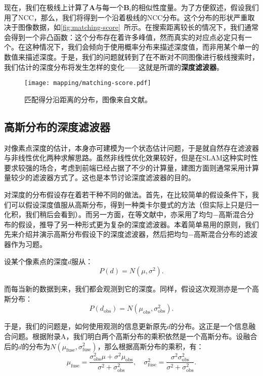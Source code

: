 现在，我们在极线上计算了$\bm{A}$与每一个$\bm{B}_i$的相似性度量。为了方便叙述，假设我们用了NCC，那么，我们将得到一个沿着极线的NCC分布。这个分布的形状严重取决于图像数据，如\autoref{fig:matching-score}~所示。在搜索距离较长的情况下，我们通常会得到一个非凸函数：这个分布存在着许多峰值，然而真实的对应点必定只有一个。在这种情况下，我们会倾向于使用概率分布来描述深度值，而非用某个单一的数值来描述深度。于是，我们的问题就转到了在不断对不同图像进行极线搜索时，我们估计的深度分布将发生怎样的变化——这就是所谓的\textbf{深度滤波器}。

\begin{figure}[!htp]
	\centering
	\texttt{[image: mapping/matching-score.pdf]}
	\caption{匹配得分沿距离的分布，图像来自文献\cite{Vogiatzis2011}。}
	\label{fig:matching-score}
\end{figure}

\subsection{高斯分布的深度滤波器}
对像素点深度的估计，本身亦可建模为一个状态估计问题，于是就自然存在滤波器与非线性优化两种求解思路。虽然非线性优化效果较好，但是在SLAM这种实时性要求较强的场合，考虑到前端已经占据了不少的计算量，建图方面则通常采用计算量较少的滤波器方式了。这也是本节讨论深度滤波器的目的。

对深度的分布假设存在着若干种不同的做法。首先，在比较简单的假设条件下，我们可以假设深度值服从高斯分布，得到一种类卡尔曼式的方法（但实际上只是归一化积，我们稍后会看到）。而另一方面，在\cite{Vogiatzis2011, Forster2014}等文献中，亦采用了均匀−高斯混合分布的假设，推导了另一种形式更为复杂的深度滤波器。本着简单易用的原则，我们先来介绍并演示高斯分布假设下的深度滤波器，然后把均匀−高斯混合分布的滤波器作为习题。

设某个像素点的深度$d$服从：
\begin{equation}
P(d) = N(\mu, \sigma^2).
\end{equation}

而每当新的数据到来，我们都会观测到它的深度。同样，假设这次观测亦是一个高斯分布：
\begin{equation}
P(d_{\mathrm{obs}}) = N(\mu_{\mathrm{obs}}, \sigma_{\mathrm{obs}}^2 ).
\end{equation}

于是，我们的问题是，如何使用观测的信息更新原先$d$的分布。这正是一个信息融合问题。根据附录A，我们明白两个高斯分布的乘积依然是一个高斯分布。设融合后的$d$的分布为$N(\mu_{\mathrm{fuse}}, \sigma_{\mathrm{fuse}}^2)$，那么根据高斯分布的乘积，有：
\begin{equation}
{\mu _{\mathrm{fuse}}} = \frac{{\sigma _{\mathrm{obs}}^2\mu  + {\sigma ^2}{\mu _{\mathrm{obs}}}}}{{{\sigma ^2} + \sigma _{\mathrm{obs}}^2}},\quad \sigma _{\mathrm{fuse}}^2 = \frac{{{\sigma ^2}\sigma _{\mathrm{obs}}^2}}{{{\sigma ^2} + \sigma _{\mathrm{obs}}^2}}.
\end{equation}

